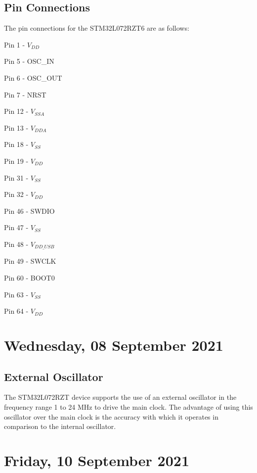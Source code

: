 \subsection{Pin Connections}

The pin connections for the STM32L072RZT6 are as follows:

\begin{compactitem}
	\item Pin 1 - $V_{DD}$
	\item Pin 5 - OSC\_IN
	\item Pin 6 - OSC\_OUT
	\item Pin 7 - NRST
	\item Pin 12 - $V_{SSA}$
	\item Pin 13 - $V_{DDA}$
	\item Pin 18 - $V_{SS}$
	\item Pin 19 - $V_{DD}$
	\item Pin 31 - $V_{SS}$
	\item Pin 32 - $V_{DD}$
	\item Pin 46 - SWDIO
	\item Pin 47 - $V_{SS}$
	\item Pin 48 - $V_{DD\_USB}$
	\item Pin 49 - SWCLK
	\item Pin 60 - BOOT0
	\item Pin 63 - $V_{SS}$
	\item Pin 64 - $V_{DD}$
\end{compactitem}

\pendsign

\section[2021/09/08]{Wednesday, 08 September 2021}

\subsection{External Oscillator}

The STM32L072RZT device supports the use of an external oscillator in the frequency range 1 to 24 MHz to drive the main clock. The advantage of using this oscillator over the main clock is the accuracy with which it operates in comparison to the internal oscillator.

\pendsign

\section[2021/09/10]{Friday, 10 September 2021}

